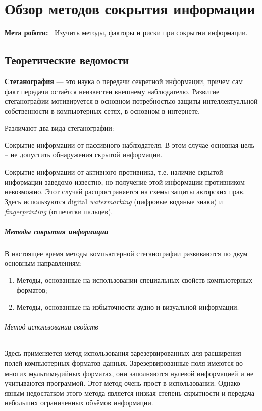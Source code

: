 \chapter{Обзор методов сокрытия информации} \label{chapt7}%
\textbf{Мета роботи:~}%
Изучить методы, факторы и риски при сокрытии информации.
\section{Теоретические ведомости} \label{sect6_a}
%
\textbf{Стеганография} --- это наука о передачи секретной информации, причем
сам факт передачи остаётся неизвестен внешнему наблюдателю. Развитие
стеганографии мотивируется в основном потребностью защиты интеллектуальной
собственности в компьютерных сетях, в основном в интернете.

\noindent Различают два вида стеганографии:%
\begin{Notes}
  \item  Сокрытие информации от пассивного наблюдателя. В этом случае основная цель – не
допустить обнаружения скрытой информации.
  \item  Сокрытие информации от активного противника, т.е. наличие скрытой
информации заведомо известно, но получение этой информации противником
невозможно. Этот случай распространяется на схемы защиты авторских прав.
Здесь используются digital \emph{watermarking} (цифровые водяные знаки) и
\emph{fingerprinting} (отпечатки пальцев).
\end{Notes}

\paragraph{Методы сокрытия информации}

В настоящее время методы компьютерной стеганографии развиваются по двум
основным направлениям:
\begin{enumerate}
  \item  Методы, основанные на использовании специальных свойств
      компьютерных форматов;
  \item Методы, основанные на избыточности аудио и визуальной информации.
\end{enumerate}

\subparagraph{Метод использовании свойств}
%
Здесь применяется метод использования зарезервированных для расширения полей
компьютерных форматов данных. Зарезервированные поля имеются во многих
мультимедийных форматах, они заполняются нулевой информацией и не учитываются
программой. Этот метод очень прост в использовании. Однако явным недостатком
этого метода является низкая степень скрытности и передача небольших
ограниченных объёмов информации.

